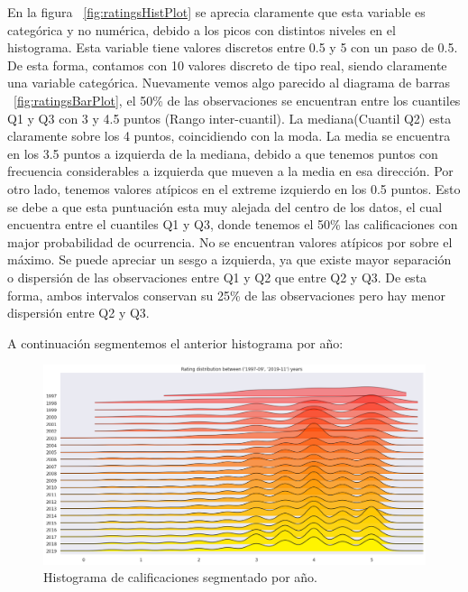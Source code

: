\documentclass[11pt,a4paper,twoside]{thesis}
\begin{document}
En la figura ~\ref{fig:ratingsHistPlot} se aprecia claramente que esta variable
es categórica y no numérica, debido a los picos con distintos niveles en el
histograma. Esta variable tiene valores discretos entre 0.5 y 5 con un paso de
0.5. De esta forma, contamos con 10 valores discreto de tipo real, siendo
claramente una variable categórica. Nuevamente vemos algo parecido al diagrama
de barras ~\ref{fig:ratingsBarPlot}, el 50\% de las observaciones se encuentran
entre los cuantiles Q1 y Q3 con 3 y 4.5 puntos (Rango inter-cuantil). La
mediana(Cuantil Q2) esta claramente sobre los 4 puntos, coincidiendo con la
moda. La media se encuentra en los 3.5 puntos a izquierda de la mediana, debido
a que tenemos puntos con frecuencia considerables a izquierda que mueven a la
media en esa dirección. Por otro lado, tenemos valores atípicos en el extreme
izquierdo en los 0.5 puntos. Esto se debe a que esta puntuación esta muy
alejada del centro de los datos, el cual encuentra entre el cuantiles Q1 y Q3,
donde tenemos el 50\% las calificaciones con major probabilidad de ocurrencia.
No se encuentran valores atípicos por sobre el máximo. Se puede apreciar un
sesgo a izquierda, ya que existe mayor separación o dispersión de las
observaciones entre Q1 y Q2 que entre Q2 y Q3. De esta forma, ambos intervalos
conservan su 25\% de las observaciones pero hay menor dispersión entre Q2 y Q3.

\clearpage
A continuación segmentemos el anterior histograma por año:

\begin{figure}[h!]
	\centering
	\includegraphics[width=15cm]{./images/rating-by-year.png}
	\caption{Histograma de calificaciones segmentado por año.}
	\label{fig:ratingsYearHistPlot}
\end{figure}
\end{document}

